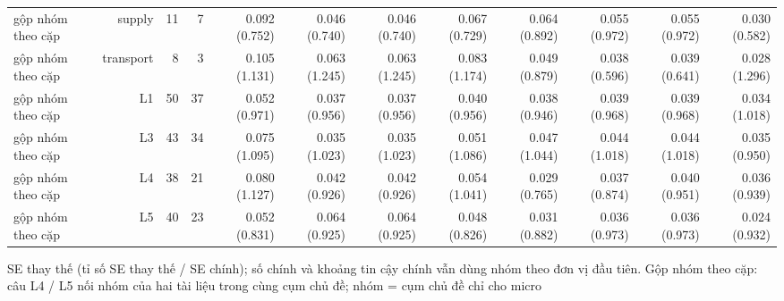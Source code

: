 \begin{table}[ht]
\begin{tabular}{lrrrrrrrrrrr}
gộp nhóm theo cặp & supply & 11 & 7 & 0.092 (0.752) & 0.046 (0.740) & 0.046 (0.740) & 0.067 (0.729) & 0.064 (0.892) & 0.055 (0.972) & 0.055 (0.972) & 0.030 (0.582) \\
gộp nhóm theo cặp & transport & 8 & 3 & 0.105 (1.131) & 0.063 (1.245) & 0.063 (1.245) & 0.083 (1.174) & 0.049 (0.879) & 0.038 (0.596) & 0.039 (0.641) & 0.028 (1.296) \\
gộp nhóm theo cặp & L1 & 50 & 37 & 0.052 (0.971) & 0.037 (0.956) & 0.037 (0.956) & 0.040 (0.956) & 0.038 (0.946) & 0.039 (0.968) & 0.039 (0.968) & 0.034 (1.018) \\
gộp nhóm theo cặp & L3 & 43 & 34 & 0.075 (1.095) & 0.035 (1.023) & 0.035 (1.023) & 0.051 (1.086) & 0.047 (1.044) & 0.044 (1.018) & 0.044 (1.018) & 0.035 (0.950) \\
gộp nhóm theo cặp & L4 & 38 & 21 & 0.080 (1.127) & 0.042 (0.926) & 0.042 (0.926) & 0.054 (1.041) & 0.029 (0.765) & 0.037 (0.874) & 0.040 (0.951) & 0.036 (0.939) \\
gộp nhóm theo cặp & L5 & 40 & 23 & 0.052 (0.831) & 0.064 (0.925) & 0.064 (0.925) & 0.048 (0.826) & 0.031 (0.882) & 0.036 (0.973) & 0.036 (0.973) & 0.024 (0.932) \\
\bottomrule
\end{tabular}
\par\smallskip\footnotesize SE thay thế (tỉ số SE thay thế / SE chính); số chính và khoảng tin cậy chính vẫn dùng nhóm theo đơn vị đầu tiên. Gộp nhóm theo cặp: câu L4 / L5 nối nhóm của hai tài liệu trong cùng cụm chủ đề; nhóm = cụm chủ đề chỉ cho micro
\end{table}

